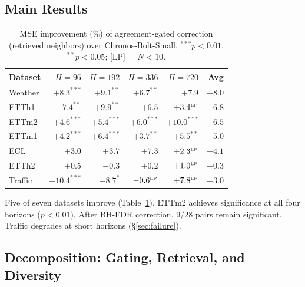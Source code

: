 \documentclass{article}
\begin{document}
\subsection{Main Results}
\label{sec:main}

\begin{table}[t]
\centering
\caption{MSE improvement (\%) of agreement-gated correction (retrieved neighbors) over Chronos-Bolt-Small. $^{***}p{<}0.01$, $^{**}p{<}0.05$; [LP] = $N{<}10$.}
\label{tab:main}
\small
\begin{tabular}{l r r r r r}
\toprule
Dataset & $H{=}96$ & $H{=}192$ & $H{=}336$ & $H{=}720$ & Avg \\
\midrule
Weather & $+8.3^{***}$ & $+9.1^{**}$ & $+6.7^{**}$ & $+7.9$ & $+8.0$ \\
ETTh1 & $+7.4^{**}$ & $+9.9^{**}$ & $+6.5$ & $+3.4^{\text{\tiny LP}}$ & $+6.8$ \\
ETTm2 & $+4.6^{***}$ & $+5.4^{***}$ & $+6.0^{***}$ & $+10.0^{***}$ & $+6.5$ \\
ETTm1 & $+4.2^{***}$ & $+6.4^{***}$ & $+3.7^{**}$ & $+5.5^{**}$ & $+5.0$ \\
ECL & $+3.0$ & $+3.7$ & $+7.3$ & $+2.3^{\text{\tiny LP}}$ & $+4.1$ \\
\midrule
ETTh2 & $+0.5$ & $-0.3$ & $+0.2$ & $+1.0^{\text{\tiny LP}}$ & $+0.3$ \\
Traffic & $-10.4^{***}$ & $-8.7^*$ & $-0.6^{\text{\tiny LP}}$ & $+7.8^{\text{\tiny LP}}$ & $-3.0$ \\
\bottomrule
\end{tabular}
\end{table}

Five of seven datasets improve (Table~\ref{tab:main}). ETTm2 achieves significance at all four horizons ($p < 0.01$). After BH-FDR correction, 9/28 pairs remain significant. Traffic degrades at short horizons (\S\ref{sec:failure}).

\subsection{Decomposition: Gating, Retrieval, and Diversity}
\label{sec:decomposition}
\end{document}
